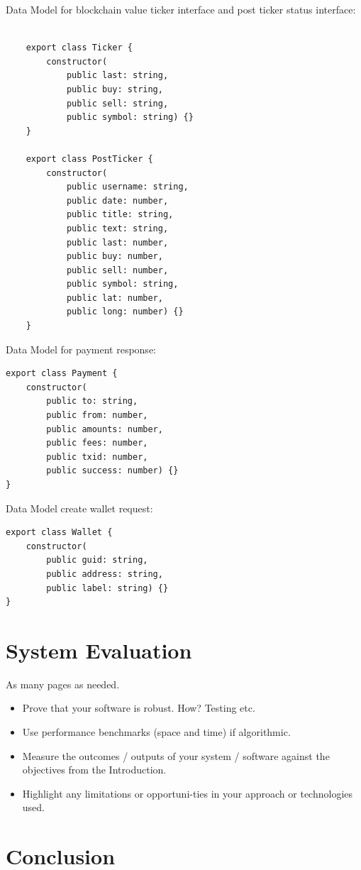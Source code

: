 Data Model for blockchain value ticker interface and post ticker status interface:
\begin{lstlisting}
       
    export class Ticker {
        constructor(
            public last: string,
            public buy: string,
            public sell: string,
            public symbol: string) {}
    }
    
    export class PostTicker {
        constructor(
            public username: string,
            public date: number,
            public title: string,
            public text: string,
            public last: number,
            public buy: number,
            public sell: number,
            public symbol: string,
            public lat: number,
            public long: number) {}
    }
\end{lstlisting}

Data Model for payment response:
\begin{lstlisting}
export class Payment {
    constructor(
        public to: string,
        public from: number,
        public amounts: number,
        public fees: number,
        public txid: number,
        public success: number) {}
}
\end{lstlisting}

Data Model create wallet request:
\begin{lstlisting}
export class Wallet {
    constructor(
        public guid: string,
        public address: string,
        public label: string) {}
}
\end{lstlisting}

\chapter{System Evaluation}
As many pages as needed.
\begin{itemize}
\item Prove that your software is robust. How? Testing etc. 
\item Use performance benchmarks (space and time) if algorithmic.
\item Measure the outcomes / outputs of your system / software against the objectives from the Introduction.
\item Highlight any limitations or opportuni-ties in your approach or technologies used.
\end{itemize}

\chapter{Conclusion}


